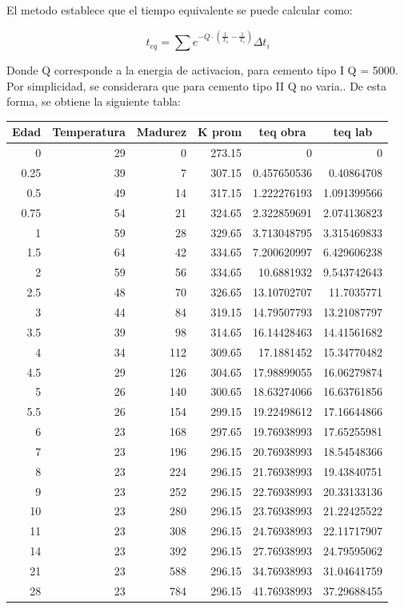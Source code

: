 El metodo establece que el tiempo equivalente se puede calcular como:

\begin{equation}
    t_{eq} = \sum e^{-Q \cdot (\frac{1}{T_a} - \frac{1}{T_s})} \Delta t_i
\end{equation}

Donde Q corresponde a la energia de activacion, para cemento tipo I Q = 5000. Por simplicidad, se considerara que para cemento tipo II Q no varia.. De esta forma, se obtiene la siguiente tabla:

\begin{table}[H]
\centering
\renewcommand{\arraystretch}{1.15}
\begin{tabular}{r r r r r r}
\hline
\multicolumn{1}{c}{Edad} & \multicolumn{1}{c}{Temperatura} & \multicolumn{1}{c}{Madurez} & \multicolumn{1}{c}{K prom} & \multicolumn{1}{c}{teq obra} & \multicolumn{1}{c}{teq lab} \\
\hline
0 & 29 & 0 & 273.15 & 0 & 0 \\
0.25 & 39 & 7 & 307.15 & 0.457650536 & 0.40864708 \\
0.5 & 49 & 14 & 317.15 & 1.222276193 & 1.091399566 \\
0.75 & 54 & 21 & 324.65 & 2.322859691 & 2.074136823 \\
1 & 59 & 28 & 329.65 & 3.713048795 & 3.315469833 \\
1.5 & 64 & 42 & 334.65 & 7.200620997 & 6.429606238 \\
2 & 59 & 56 & 334.65 & 10.6881932 & 9.543742643 \\
2.5 & 48 & 70 & 326.65 & 13.10702707 & 11.7035771 \\
3 & 44 & 84 & 319.15 & 14.79507793 & 13.21087797 \\
3.5 & 39 & 98 & 314.65 & 16.14428463 & 14.41561682 \\
4 & 34 & 112 & 309.65 & 17.1881452 & 15.34770482 \\
4.5 & 29 & 126 & 304.65 & 17.98899055 & 16.06279874 \\
5 & 26 & 140 & 300.65 & 18.63274066 & 16.63761856 \\
5.5 & 26 & 154 & 299.15 & 19.22498612 & 17.16644866 \\
6 & 23 & 168 & 297.65 & 19.76938993 & 17.65255981 \\
7 & 23 & 196 & 296.15 & 20.76938993 & 18.54548366 \\
8 & 23 & 224 & 296.15 & 21.76938993 & 19.43840751 \\
9 & 23 & 252 & 296.15 & 22.76938993 & 20.33133136 \\
10 & 23 & 280 & 296.15 & 23.76938993 & 21.22425522 \\
11 & 23 & 308 & 296.15 & 24.76938993 & 22.11717907 \\
14 & 23 & 392 & 296.15 & 27.76938993 & 24.79595062 \\
21 & 23 & 588 & 296.15 & 34.76938993 & 31.04641759 \\
28 & 23 & 784 & 296.15 & 41.76938993 & 37.29688455 \\
\hline
\end{tabular}
\end{table}

